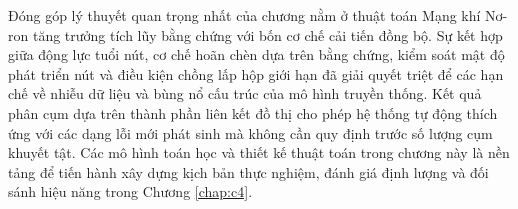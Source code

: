 Đóng góp lý thuyết quan trọng nhất của chương nằm ở thuật toán Mạng khí Nơ-ron tăng trưởng tích lũy bằng chứng với bốn cơ chế cải tiến đồng bộ. Sự kết hợp giữa động lực tuổi nút, cơ chế hoãn chèn dựa trên bằng chứng, kiểm soát mật độ phát triển nút và điều kiện chồng lấp hộp giới hạn đã giải quyết triệt để các hạn chế về nhiễu dữ liệu và bùng nổ cấu trúc của mô hình truyền thống. Kết quả phân cụm dựa trên thành phần liên kết đồ thị cho phép hệ thống tự động thích ứng với các dạng lỗi mới phát sinh mà không cần quy định trước số lượng cụm khuyết tật. Các mô hình toán học và thiết kế thuật toán trong chương này là nền tảng để tiến hành xây dựng kịch bản thực nghiệm, đánh giá định lượng và đối sánh hiệu năng trong Chương \ref{chap:c4}.
